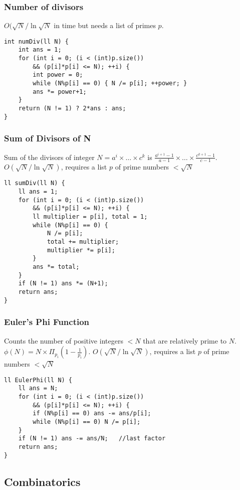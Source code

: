 \documentclass[10pt]{article}{\twocolumn}
\begin{document}
\subsubsection{Number of divisors}
$O(\sqrt{N}/\ln\sqrt{N}$ in time but needs a list of primes $p$.
\begin{lstlisting}
int numDiv(ll N) {
    int ans = 1;
    for (int i = 0; (i < (int)p.size()) 
        && (p[i]*p[i] <= N); ++i) {
        int power = 0;
        while (N%p[i] == 0) { N /= p[i]; ++power; }
        ans *= power+1;
    }
    return (N != 1) ? 2*ans : ans;
}
\end{lstlisting}

\subsubsection{Sum of Divisors of N}
Sum of the divisors of integer $N = a^i \times \dots \times c^k$ is
$\frac{a^{i+1}-1}{a - 1} \times \dots \times \frac{c^{k+1} - 1}{c - 1}$. \newline
$O(\sqrt{N} / \ln{\sqrt{N}})$, requires a list $p$ of prime numbers $< \sqrt{N}$
\begin{lstlisting}
ll sumDiv(ll N) {
    ll ans = 1; 
    for (int i = 0; (i < (int)p.size()) 
        && (p[i]*p[i] <= N); ++i) {
        ll multiplier = p[i], total = 1;
        while (N%p[i] == 0) {
            N /= p[i];
            total += multiplier;
            multiplier *= p[i];
        }
        ans *= total;
    }
    if (N != 1) ans *= (N+1);
    return ans;
}
\end{lstlisting}

\subsubsection{Euler's Phi Function}
Counts the number of positive integers $< N$ that are relatively prime 
to $N$. $\phi(N) = N \times \Pi_{p_i}(1-\frac{1}{p_i})$. \newline
$O(\sqrt{N}/ \ln{\sqrt{N}})$, requires a list $p$ of prime numbers $< \sqrt{N}$
\begin{lstlisting}
ll EulerPhi(ll N) {
    ll ans = N;
    for (int i = 0; (i < (int)p.size()) 
        && (p[i]*p[i] <= N); ++i) {
        if (N%p[i] == 0) ans -= ans/p[i];
        while (N%p[i] == 0) N /= p[i];
    }
    if (N != 1) ans -= ans/N;   //last factor
    return ans;
}
\end{lstlisting}

\subsection{Combinatorics}
\end{document}
